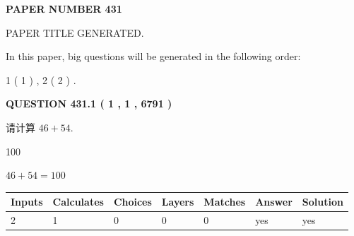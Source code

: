 \documentclass{ctexart}
\begin{document}
   
 {\textbf{ \Large{ PAPER NUMBER  431  }}}
   
   
\vspace{0.2in}
   
   
   
   
   
   
   
   
 \vspace{0.2in}
 
 
 
 
   
   
 PAPER TITLE GENERATED.
   
   
   
\vspace{0.2in}
   
In this paper, big questions will be generated in the following order: 
   
   
   1 ( 1 )
 ,
   2 ( 2 )
 .
  
\vspace{0.2in}
  
{\textbf{\Large{QUESTION
431.1 
 ( 1 , 1 , 6791 )
}}}
  
  
 
请计算 $ %
46 +  %
54 $.
 
 
 
\noindent{}
 
 

100
 
 
\noindent{}
 
 

 
 
 
\noindent{}
 
 

$ %
46 +  %
54=   %
100$
 
 
\noindent{}
 
 

 
   
   
   
   
\noindent\begin{tabular}{|l|l|l|l|l|l|l|}
 \hline
Inputs & Calculates & Choices & Layers & Matches & Answer & Solution \\ \hline
 2  & 
 1  & 
 0
  & 
 0  & 
 0  & 
  yes & 
  yes 
  \\ \hline
 \end{tabular}
   
\end{document}
